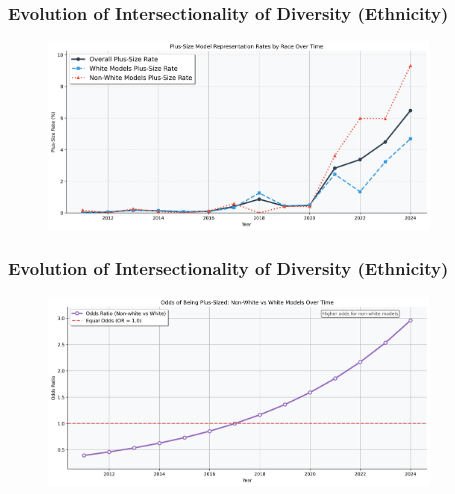 \documentclass[aspectratio=169,xcolor=dvipsnames,10pt]{beamer}
\begin{document}
\begin{frame}[t]
    \frametitle{Evolution of Intersectionality of Diversity (Ethnicity)}
    \begin{figure}
            \begin{center}
            \includegraphics[width=0.9\textwidth]{figures/plus_size_rates_by_race.png}
            \end{center}
        \end{figure}
\end{frame}

\begin{frame}[t]
    \frametitle{Evolution of Intersectionality of Diversity (Ethnicity)}
    \begin{figure}
            \begin{center}
            \includegraphics[width=0.9\textwidth]{figures/race_odds_ratio_trends_odds_ratio.png}
            \end{center}
        \end{figure}
\end{frame}
\end{document}

